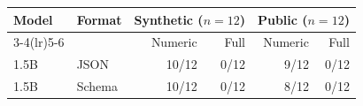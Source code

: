 \begin{tabular}{llrrrr}
\toprule
Model & Format & \multicolumn{2}{c}{Synthetic ($n=12$)} & \multicolumn{2}{c}{Public ($n=12$)} \\
\cmidrule(lr){3-4}\cmidrule(lr){5-6}
 & & Numeric & Full & Numeric & Full \\
\midrule
1.5B & JSON & 10/12 & 0/12 & 9/12 & 0/12 \\
1.5B & Schema & 10/12 & 0/12 & 8/12 & 0/12 \\
\bottomrule
\end{tabular}
